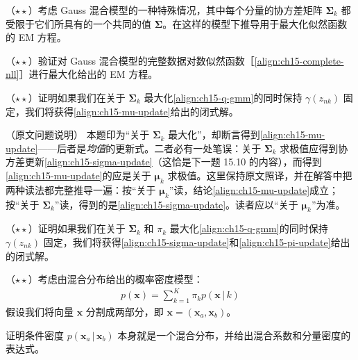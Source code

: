 \documentclass[../../main.tex]{subfiles}
\begin{document}
\begin{exercise}\label{exercise:ch15-07}
（$\star\star$）考虑 Gauss 混合模型的一种特殊情况，其中每个分量的协方差矩阵 $\bm{\Sigma}_k$ 都受限于它们所具有的一个共同的值 $\bm{\Sigma}$。在这样的模型下推导用于最大化似然函数的 EM 方程。
\end{exercise}

\begin{exercise}\label{exercise:ch15-08}
（$\star\star$）验证对 Gauss 混合模型的完整数据对数似然函数［\eqref{align:ch15-complete-nll}］进行最大化给出的 EM 方程。
\end{exercise}

\begin{exercise}\label{exercise:ch15-09}
（$\star\star$）证明如果我们在关于 $\bm{\Sigma}_k$ 最大化\eqref{align:ch15-q-gmm}的同时保持 $\gamma(z_{nk})$ 固定，我们将获得\eqref{align:ch15-mu-update}给出的闭式解。
\end{exercise}
\begin{remark}（原文问题说明）
本题印为“关于 $\bm{\Sigma}_k$ 最大化”，却断言得到\eqref{align:ch15-mu-update}——后者是\emph{均值}的更新式。二者必有一处笔误：关于 $\bm{\Sigma}_k$ 求极值应得到协方差更新\eqref{align:ch15-sigma-update}（这恰是下一题 15.10 的内容），而得到\eqref{align:ch15-mu-update}的应是关于 $\bm{\mu}_k$ 求极值。这里保持原文照译，并在解答中把两种读法都完整推导一遍：按“关于 $\bm{\mu}_k$”读，结论\eqref{align:ch15-mu-update}成立；按“关于 $\bm{\Sigma}_k$”读，得到的是\eqref{align:ch15-sigma-update}。读者应以“关于 $\bm{\mu}_k$”为准。
\end{remark}

\begin{exercise}\label{exercise:ch15-10}
（$\star\star$）证明如果我们在关于 $\bm{\Sigma}_k$ 和 $\pi_k$ 最大化\eqref{align:ch15-q-gmm}的同时保持 $\gamma(z_{nk})$ 固定，我们将获得\eqref{align:ch15-sigma-update}和\eqref{align:ch15-pi-update}给出的闭式解。
\end{exercise}

\begin{exercise}\label{exercise:ch15-11}
（$\star\star$）考虑由混合分布给出的概率密度模型：
\begin{align}
p(\bm{x})=\sum_{k=1}^{K}\pi_k p(\bm{x}\,|\,k)
\label{align:ch15-ex-mixture}
\end{align}
假设我们将向量 $\bm{x}$ 分割成两部分，即 $\bm{x}=(\bm{x}_a,\bm{x}_b)$。

证明条件密度 $p(\bm{x}_a\,|\,\bm{x}_b)$ 本身就是一个混合分布，并给出混合系数和分量密度的表达式。
\end{exercise}
\end{document}
